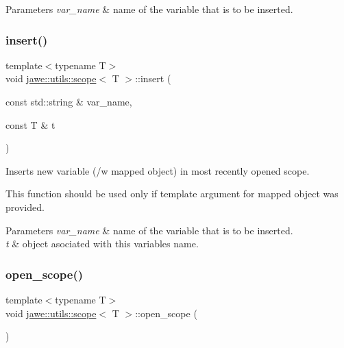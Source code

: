 \begin{DoxyParams}{Parameters}
{\em var\+\_\+name} & name of the variable that is to be inserted. \\
\hline
\end{DoxyParams}
\mbox{\label{classjawe_1_1utils_1_1scope_a1ec20561626de104ee908db764db552f}} 
\subsubsection{\texorpdfstring{insert()}{insert()}\hspace{0.1cm}{\footnotesize\ttfamily [2/2]}}
{\footnotesize\ttfamily template$<$typename T$>$ \\
void \hyperlink{classjawe_1_1utils_1_1scope}{jawe\+::utils\+::scope}$<$ T $>$\+::insert (\begin{DoxyParamCaption}\item[{const std\+::string \&}]{var\+\_\+name,  }\item[{const T \&}]{t }\end{DoxyParamCaption})\hspace{0.3cm}{\ttfamily [inline]}}

Inserts new variable (/w mapped object) in most recently opened scope.

This function should be used only if template argument for mapped object was provided.


\begin{DoxyParams}{Parameters}
{\em var\+\_\+name} & name of the variable that is to be inserted. \\
\hline
{\em t} & object asociated with this variable\textquotesingle{}s name. \\
\hline
\end{DoxyParams}
\mbox{\label{classjawe_1_1utils_1_1scope_a8635bf451db602f690e326d063833e95}} 
\subsubsection{\texorpdfstring{open\+\_\+scope()}{open\_scope()}}
{\footnotesize\ttfamily template$<$typename T$>$ \\
void \hyperlink{classjawe_1_1utils_1_1scope}{jawe\+::utils\+::scope}$<$ T $>$\+::open\+\_\+scope (\begin{DoxyParamCaption}{ }\end{DoxyParamCaption})\hspace{0.3cm}{\ttfamily [inline]}}

